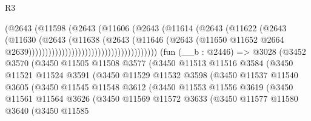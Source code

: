 \begin{lexlean}{R3}
\begin{coremodule}
                                                  (@2643
                                                    (@11598
                                                      (@2643
                                                        (@11606
                                                          (@2643
                                                            (@11614
                                                              (@2643
                                                                (@11622
                                                                  (@2643
                                                                    (@11630
                                                                      (@2643
                                                                        (@11638
                                                                          (@2643
                                                                            (@11646
                                                                              (@2643
                                                                                (@11650
                                                                                  @11652
                                                                                  @2664
                                                                                  @2639)))))))))))))))))))))))))))))))))))))))
    (fun (__b : @2446) =>
    @3028
      (@3452
        @3570
        (@3450
          @11505
          @11508
          @3577
          (@3450
            @11513
            @11516
            @3584
            (@3450
              @11521
              @11524
              @3591
              (@3450
                @11529
                @11532
                @3598
                (@3450
                  @11537
                  @11540
                  @3605
                  (@3450
                    @11545
                    @11548
                    @3612
                    (@3450
                      @11553
                      @11556
                      @3619
                      (@3450
                        @11561
                        @11564
                        @3626
                        (@3450
                          @11569
                          @11572
                          @3633
                          (@3450
                            @11577
                            @11580
                            @3640
                            (@3450
                              @11585

\end{coremodule}
\end{lexlean}
